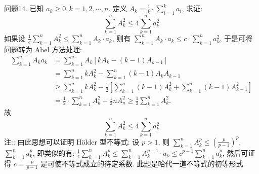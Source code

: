 问题14. 已知 $a_k \geqslant 0, k=1,2, \cdots, n$. 定义 $A_k=\frac{1}{k} \cdot \sum_{i=1}^k a_i$, 求证:
$$
\sum_{k=1}^n A_k^2 \leqslant 4 \sum_{k=1}^n a_k^2
$$
如果设 $\frac{1}{c} \sum_{k=1}^n A_k^2 \leqslant \sum_{k=1}^n A_k \cdot a_k$, 则有 $\sum_{k=1}^n A_k \cdot a_k \leqslant c \cdot \sum_{k=1}^n a_k^2$, 于是可将问题转为 Abel 方法处理:
$$
\begin{aligned}
\sum_{k=1}^n A_k a_k & =\sum_{k=1}^n A_k\left[k A_k-(k-1) A_{k-1}\right] \\
& =\sum_{k=1}^n k A_k^2-\sum_{k=1}^n(k-1) A_k A_{k-1} \\
& \geqslant \sum_{k=1}^n k A_k^2-\frac{1}{2}\left[\sum_{k=1}^n(k-1) A_k^2+\sum_{k=1}^n(k-1) A_{k-1}^2\right] \\
& =\frac{1}{2} \cdot \sum_{k=1}^n A_k^2+\frac{1}{2} n A_n^2 \geqslant \frac{1}{2} \sum_{k=1}^n A_k^2 .
\end{aligned}
$$
故
$$
\sum_{k=1}^n A_k^2 \leqslant 4 \sum_{k=1}^n a_k^2
$$
注:: 由此思想可以证明 Hölder 型不等式: 设 $p>1$, 则 $\sum_{k=1}^n A_k^p \leqslant\left(\frac{p}{p-1}\right)^p$. $\sum_{k=1}^n a_k^p$, 即类似的有: $\frac{1}{c} \sum_{k=1}^n A_k^p \leqslant \sum_{k=1}^n A_k^{p-1} \cdot a_k \leqslant c^{p-1} \sum_{k=1}^n a_k^p$, 然后可证得 $c= \frac{p}{p-1}$ 是可使不等式成立的待定系数.
此题是哈代一道不等式的初等形式.


